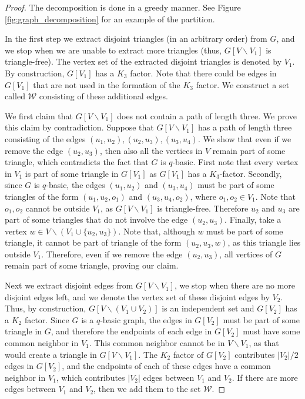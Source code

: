\documentclass[bj,authoryear,noshowframe]{imsart}
\numberwithin{equation}{section}
\theoremstyle{plain}
\theoremstyle{definition}
\renewcommand{\setminus}{\backslash}
\begin{document}
\begin{proof}
The decomposition is done in a greedy manner. See Figure \ref{fig:graph_decomposition} for an example of the partition.\par
In the first step we extract disjoint triangles (in an arbitrary order) from $G$, and we stop when we are unable to extract more triangles (thus, $G[V\setminus V_1]$ is triangle-free). The vertex set of the extracted disjoint triangles is denoted by $V_1$. By construction, $G[V_1]$ has a $K_3$ factor. Note that there could be edges in $G[V_1]$ that are not used in the formation of the $K_3$ factor. We construct a set called $\mathcal{W}$ consisting of these additional edges.
\par
We first claim that $G[V\setminus V_1]$ does not contain a path of length three. We prove this claim by contradiction. Suppose that $G[V\setminus V_1]$ has a path of length three consisting of the edges $(u_1,u_2),(u_2, u_3), (u_3,u_4)$. We show that even if we remove the edge $(u_2,u_3)$, then also all the vertices in $V$ remain part of some triangle, which contradicts the fact that $G$ is $q$-basic. First note that every vertex in $V_1$ is part of some triangle in $G[V_1]$ as $G[V_1]$ has a $K_3$-factor. Secondly, since $G$ is $q$-basic, the edges $(u_1,u_2)$ and $(u_3,u_4)$ must be part of some triangles of the form $(u_1,u_2,o_1)$ and $(u_3,u_4,o_2)$, where $o_1,o_2 \in V_1$. Note that $o_1,o_2$ cannot be outside $V_1$, as $G[V\setminus V_1]$ is triangle-free. Therefore $u_2$ and $u_3$ are part of some triangles that do not involve the edge $(u_2,u_3)$. Finally, take a vertex $w \in V\setminus (V_1 \cup \{u_2,u_3\})$. Note that, although $w$ must be part of some triangle, it cannot be part of triangle of the form $(u_2,u_3,w)$, as this triangle lies outside $V_1$. Therefore, even if we remove the edge $(u_2,u_3)$, all vertices of $G$ remain part of some triangle, proving our claim.
\par
Next we extract disjoint edges from $G[V\setminus V_1]$, we stop when there are no more disjoint edges left, and we denote the vertex set of these disjoint edges by $V_2$. Thus, by construction, $G[V\setminus (V_1\cup V_2)]$ is an independent set and $G[V_2]$ has a $K_2$ factor. Since $G$ is a $q$-basic graph, the edges in $G[V_2]$ must be part of some triangle in $G$, and therefore the endpoints of each edge in $G[V_2]$ must have some common neighbor in $V_1$. This common neighbor cannot be in $V\setminus V_1$, as that would create a triangle in $G[V\setminus V_1]$. The $K_2$ factor of $G[V_2]$ contributes $|V_2|/2$ edges in $G[V_2]$, and the endpoints of each of these edges have a common neighbor in $V_1$, which contributes $|V_2|$ edges between $V_1$ and $V_2$. If there are more edges between $V_1$ and $V_2$, then we add them to the set $\mathcal{W}$.

\end{proof}
\end{document}
